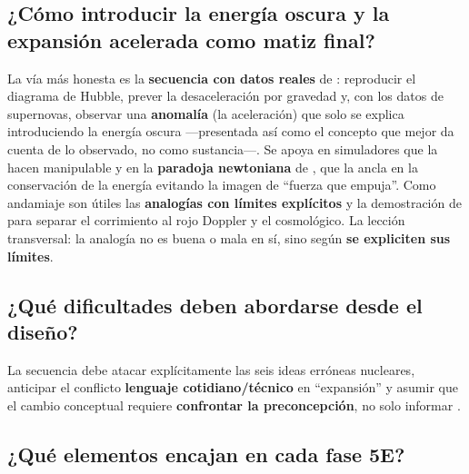 \subsection{¿Cómo introducir la energía oscura y la expansión acelerada como matiz final?}\label{sec:disc-estrategias}

La vía más honesta es la \textbf{secuencia con datos reales} de \textcite{hyde2021}: reproducir el diagrama de Hubble, prever la desaceleración por gravedad y, con los datos de supernovas, observar una \textbf{anomalía} (la aceleración) que solo se explica introduciendo la energía oscura ---presentada así como el concepto que mejor da cuenta de lo observado, no como sustancia---. Se apoya en simuladores que la hacen manipulable \parencite{raymundo2022} y en la \textbf{paradoja newtoniana} de \textcite{pereira2019}, que la ancla en la conservación de la energía evitando la imagen de ``fuerza que empuja''. Como andamiaje son útiles las \textbf{analogías con límites explícitos} \parencite{xu2018,suarez2025} y la demostración de \textcite{marshall2022} para separar el corrimiento al rojo Doppler y el cosmológico. La lección transversal: la analogía no es buena o mala en sí, sino según \textbf{se expliciten sus límites}.

\subsection{¿Qué dificultades deben abordarse desde el diseño?}

La secuencia debe atacar explícitamente las seis ideas erróneas nucleares, anticipar el conflicto \textbf{lenguaje cotidiano/técnico} en ``expansión'' \parencite{salimpour2023} y asumir que el cambio conceptual requiere \textbf{confrontar la preconcepción}, no solo informar \parencite{aretz2017}.

\subsection{¿Qué elementos encajan en cada fase 5E?}\label{sec:disc-5e}

